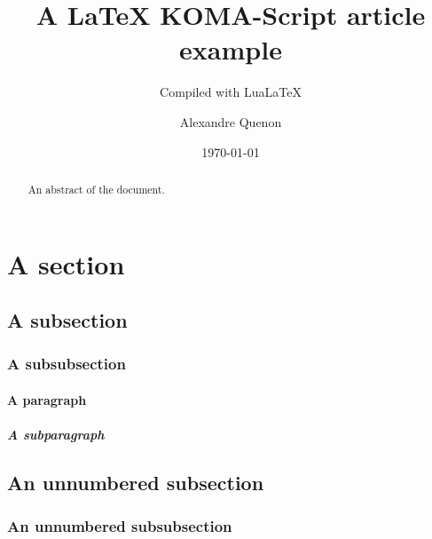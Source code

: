 \documentclass[%
	paper=A4,portrait,%
	fontsize=11pt,%
]{scrartcl}
\title{A \LaTeX{} KOMA-Script article example}
\subtitle{Compiled with Lua\LaTeX{}}
\author{Alexandre Quenon}
\date{\today}
\begin{document}

\maketitle


\begin{abstract}
	An abstract of the document.
	
	\lipsum[1-2]
\end{abstract}


\tableofcontents


\section{A section}

	\lipsum[1]
	
	
	\subsection{A subsection}
	
		\lipsum[2]
		
		
		\subsubsection{A subsubsection}
		
			\lipsum[3]
			
			
			\paragraph{A paragraph}
			
				\lipsum[4]
				
				
				\subparagraph{A subparagraph}
				
					\lipsum[5]
				
				
					
						\lipsum[6]



	\lipsum[1]
	
	
	\subsection*{An unnumbered subsection}
	
		\lipsum[2]
		
		
		\subsubsection*{An unnumbered subsubsection}
			
			\lipsum[3]



\end{document}

